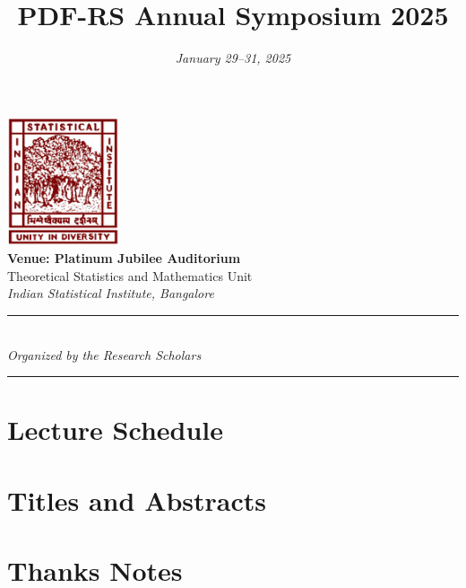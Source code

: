 \documentclass[a4paper,12pt]{article}
\title{\Huge\textbf{PDF-RS Annual Symposium 2025}}
\author{} %
\date{\vspace{-1cm}\Large\textit{January 29--31, 2025}}
\begin{document}
	
	\maketitle
	\thispagestyle{empty} %
	
	\begin{center}
		\vspace{1.5cm}
		\includegraphics[width=0.25\textwidth]{images/isi_logo.png} \\[1.5cm]
		
		{\Huge\textbf{Venue: Platinum Jubilee Auditorium}} \\[0.4cm]
		{\Large Theoretical Statistics and Mathematics Unit} \\[0.3cm]
		{\large \textit{Indian Statistical Institute, Bangalore}} \\[2cm]
		
		\rule{\textwidth}{0.5pt} \\[0.6cm]
		{\Large\textit{Organized by the Research Scholars}} \\[0.6cm]
		\rule{\textwidth}{0.5pt}
	\end{center}
	
	\newpage
	
	\section*{Lecture Schedule}
	
	\newpage
	
	\section*{Titles and Abstracts}

    
    

    
	
    
    

    \section*{Thanks Notes}
    
\end{document}

